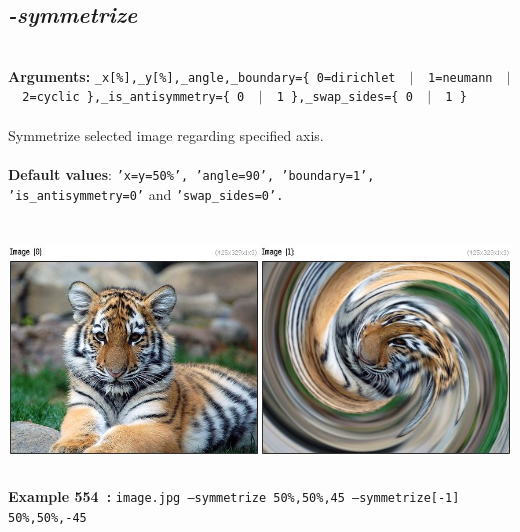 \documentclass[a4paper,11pt,twoside]{book}
\begin{document}
\subsection{\emph{-symmetrize} }\vspace*{-0.5em}
~\\\textbf{Arguments: } 
{\small \texttt{\_x[\%],\_y[\%],\_angle,\_boundary=\{ 0=dirichlet ~$|$~ 1=neumann ~$|$~ 2=cyclic \},\_is\_antisymmetry=\{ 0 ~$|$~ 1 \},\_swap\_sides=\{ 0 ~$|$~ 1 \}}}\\~\\
Symmetrize selected image regarding specified axis.
~\\~\\\textbf{Default values}: {\small \texttt{'x=y=50\%', 'angle=90', 'boundary=1', 'is\_antisymmetry=0'} and \texttt{'swap\_sides=0'.}}
\begin{center}\includegraphics[keepaspectratio=true,height=7cm,width=\textwidth]{img/gmic_def554.jpg}\\
{\footnotesize \textbf{Example 554~:} \texttt{image.jpg --symmetrize 50\%,50\%,45 --symmetrize[-1] 50\%,50\%,-45}}
\end{center}
\end{document}
